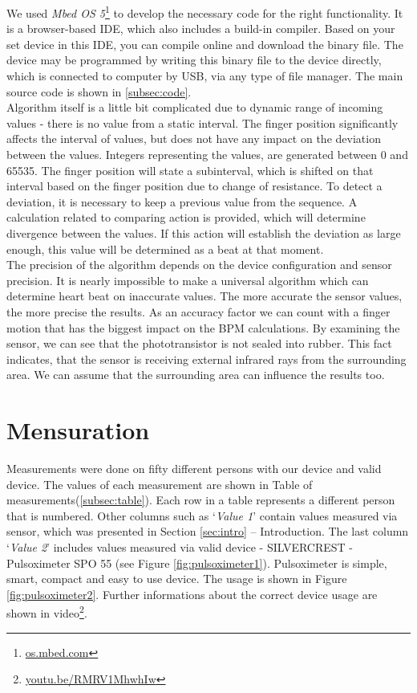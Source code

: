 \documentclass[11pt,a4paper]{article}
\begin{document}
We used \textit{Mbed OS 5}\footnote{\href{https://os.mbed.com/}{os.mbed.com}} to develop the necessary code for the right functionality. It is a browser-based IDE, which also includes a build-in compiler. Based on your set device in this IDE, you can compile online and download the binary file. The device may be programmed by writing this binary file to the device directly, which is connected to computer by USB, via any type of file manager. The main source code is shown in \ref{subsec:code}.\\

Algorithm itself is a little bit complicated due to dynamic range of incoming values - there is no value from a static interval. The finger position significantly affects the interval of values, but does not have any impact on the deviation between the values. Integers representing the values, are generated between 0 and 65535. The finger position will state a subinterval, which is shifted on that interval based on the finger position due to change of resistance. To detect a deviation, it is necessary to keep a previous value from the sequence. A calculation related to comparing action is provided, which will determine divergence between the values. If this action will establish the deviation as large enough, this value will be determined as a beat at that moment.\\

The precision of the algorithm depends on the device configuration and sensor precision. It is nearly impossible to make a universal algorithm which can determine heart beat on inaccurate values. The more accurate the sensor values, the more precise the results. As an accuracy factor we can count with a finger motion that has the biggest impact on the BPM calculations. By examining the sensor, we can see that the phototransistor is not sealed into rubber. This fact indicates, that the sensor is receiving external infrared rays from the surrounding area. We can assume that the surrounding area can influence the results too.

\section{Mensuration}\label{sec:mensuration}

Measurements were done on fifty different persons with our device and valid device. The values of each measurement are shown in Table of measurements(\ref{subsec:table}). Each row in a table represents a different person that is numbered. Other columns such as `\textit{Value 1}' contain values measured via sensor, which was presented in Section \ref{sec:intro} -- Introduction. The last column `\textit{Value 2}' includes values measured via valid device - SILVERCREST - Pulsoximeter SPO 55 (see Figure \ref{fig:pulsoximeter1}). Pulsoximeter is simple, smart, compact and easy to use device. The usage is shown in Figure \ref{fig:pulsoximeter2}. Further informations about the correct device usage are shown in video\footnote{\href{https://youtu.be/RMRV1MhwhIw}{youtu.be/RMRV1MhwhIw}}.\\
\end{document}

